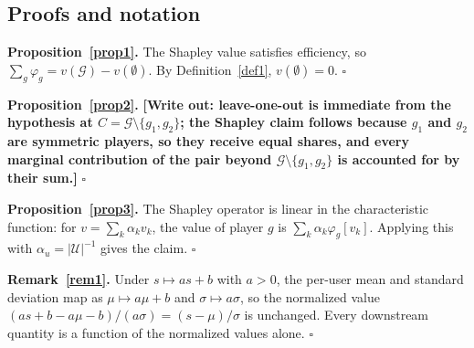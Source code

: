 \documentclass[pdflatex,sn-mathphys-num]{sn-jnl}%
\theoremstyle{thmstyleone}%
\theoremstyle{thmstyletwo}%
\theoremstyle{thmstylethree}%
\newcommand{\tbd}[1]{\textbf{[#1]}}
\newcommand{\Gset}{\mathcal{G}}
\newcommand{\Uset}{\mathcal{U}}
\begin{document}
\begin{appendices}

\section{Proofs and notation}\label{secA1}

\noindent\textbf{Proposition~\ref{prop1}.} The Shapley value satisfies efficiency, so $\sum_{g}\varphi_g=v(\Gset)-v(\emptyset)$. By Definition~\ref{def1}, $v(\emptyset)=0$. \hfill$\square$

\medskip
\noindent\textbf{Proposition~\ref{prop2}.} \tbd{Write out: leave-one-out is immediate from the hypothesis at $C=\Gset\setminus\{g_1,g_2\}$; the Shapley claim follows because $g_1$ and $g_2$ are symmetric players, so they receive equal shares, and every marginal contribution of the pair beyond $\Gset\setminus\{g_1,g_2\}$ is accounted for by their sum.} \hfill$\square$

\medskip
\noindent\textbf{Proposition~\ref{prop3}.} The Shapley operator is linear in the characteristic function: for $v=\sum_k \alpha_k v_k$, the value of player $g$ is $\sum_k \alpha_k \varphi_g[v_k]$. Applying this with $\alpha_u=|\Uset|^{-1}$ gives the claim. \hfill$\square$

\medskip
\noindent\textbf{Remark~\ref{rem1}.} Under $s\mapsto as+b$ with $a>0$, the per-user mean and standard deviation map as $\mu\mapsto a\mu+b$ and $\sigma\mapsto a\sigma$, so the normalized value $(as+b-a\mu-b)/(a\sigma)=(s-\mu)/\sigma$ is unchanged. Every downstream quantity is a function of the normalized values alone. \hfill$\square$


\end{appendices}
\end{document}
